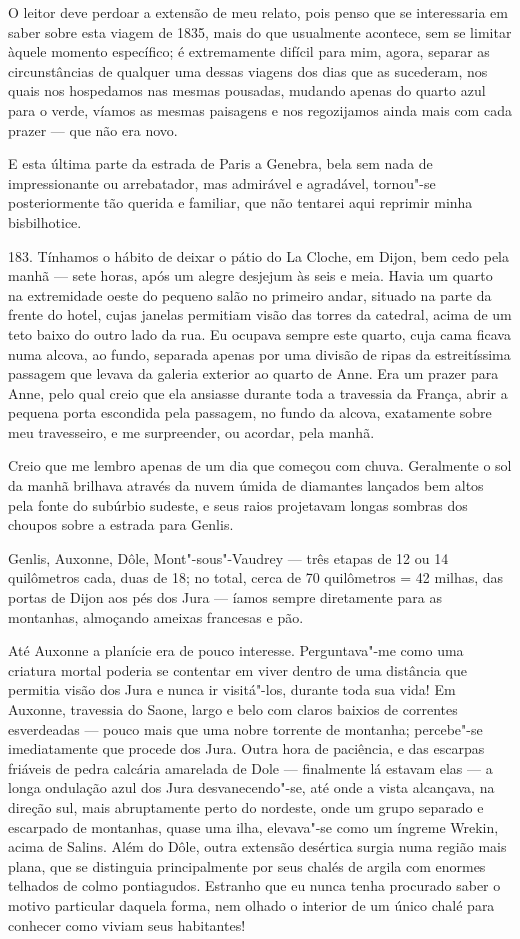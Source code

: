 O leitor deve perdoar a extensão de meu relato, pois penso que se
interessaria em saber sobre esta viagem de 1835, mais do que usualmente
acontece, sem se limitar àquele momento específico; é extremamente
difícil para mim, agora, separar as circunstâncias de qualquer uma
dessas viagens dos dias que as sucederam, nos quais nos hospedamos nas
mesmas pousadas, mudando apenas do quarto azul para o verde, víamos as
mesmas paisagens e nos regozijamos ainda mais com cada prazer --- que não
era novo.

E esta última parte da estrada de Paris a Genebra, bela sem nada de
impressionante ou arrebatador, mas admirável e agradável, tornou"-se
posteriormente tão querida e familiar, que não tentarei aqui reprimir
minha bisbilhotice.

183. Tínhamos o hábito de deixar o pátio do La Cloche, em Dijon, bem
cedo pela manhã --- sete horas, após um alegre desjejum às seis e meia.
Havia um quarto na extremidade oeste do pequeno salão no primeiro andar,
situado na parte da frente do hotel, cujas janelas permitiam visão das
torres da catedral, acima de um teto baixo do outro lado da rua. Eu
ocupava sempre este quarto, cuja cama ficava numa alcova, ao fundo,
separada apenas por uma divisão de ripas da estreitíssima passagem que
levava da galeria exterior ao quarto de Anne. Era um prazer para Anne,
pelo qual creio que ela ansiasse durante toda a travessia da França,
abrir a pequena porta escondida pela passagem, no fundo da alcova,
exatamente sobre meu travesseiro, e me surpreender, ou acordar, pela
manhã.

Creio que me lembro apenas de um dia que começou com chuva.
Geralmente o sol da manhã brilhava através da nuvem úmida de diamantes
lançados bem altos pela fonte do subúrbio sudeste, e seus raios
projetavam longas sombras dos choupos sobre a estrada para Genlis.

Genlis, Auxonne, Dôle, Mont"-sous"-Vaudrey --- três etapas de 12 ou 14
quilômetros cada, duas de 18; no total, cerca de 70 quilômetros = 42
milhas, das portas de Dijon aos pés dos Jura --- íamos sempre diretamente
para as montanhas, almoçando ameixas francesas e pão.

Até Auxonne a planície era de pouco interesse. Perguntava"-me como uma
criatura mortal poderia se contentar em viver dentro de uma distância
que permitia visão dos Jura e nunca ir visitá"-los, durante toda sua
vida! Em Auxonne, travessia do Saone, largo e belo com claros baixios de
correntes esverdeadas --- pouco mais que uma nobre torrente de montanha;
percebe"-se imediatamente que procede dos Jura. Outra hora de paciência,
e das escarpas friáveis de pedra calcária amarelada de Dole ---
finalmente lá estavam elas --- a longa ondulação azul dos Jura
desvanecendo"-se, até onde a vista alcançava, na direção sul, mais
abruptamente perto do nordeste, onde um grupo separado e escarpado de
montanhas, quase uma ilha, elevava"-se como um íngreme Wrekin, acima de
Salins. Além do Dôle, outra extensão desértica surgia numa região mais
plana, que se distinguia principalmente por seus chalés de argila com
enormes telhados de colmo pontiagudos. Estranho que eu nunca tenha
procurado saber o motivo particular daquela forma, nem olhado o interior
de um único chalé para conhecer como viviam seus habitantes!


